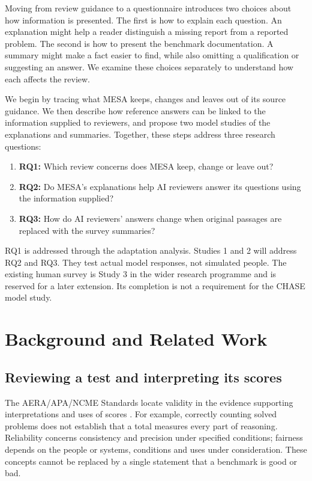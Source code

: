 \documentclass[10pt,conference]{IEEEtran}
\begin{document}
Moving from review guidance to a questionnaire introduces two choices about how information is presented. The first is how to explain each question. An explanation might help a reader distinguish a missing report from a reported problem. The second is how to present the benchmark documentation. A summary might make a fact easier to find, while also omitting a qualification or suggesting an answer. We examine these choices separately to understand how each affects the review.

We begin by tracing what MESA keeps, changes and leaves out of its source guidance. We then describe how reference answers can be linked to the information supplied to reviewers, and propose two model studies of the explanations and summaries. Together, these steps address three research questions:
\begin{enumerate}
\item \textbf{RQ1:} Which review concerns does MESA keep, change or leave out?
\item \textbf{RQ2:} Do MESA's explanations help AI reviewers answer its questions using the information supplied?
\item \textbf{RQ3:} How do AI reviewers' answers change when original passages are replaced with the survey summaries?
\end{enumerate}
RQ1 is addressed through the adaptation analysis. Studies 1 and 2 will address RQ2 and RQ3. They test actual model responses, not simulated people. The existing human survey is Study 3 in the wider research programme and is reserved for a later extension. Its completion is not a requirement for the CHASE model study.

\section{Background and Related Work}
\subsection{Reviewing a test and interpreting its scores}
The AERA/APA/NCME Standards locate validity in the evidence supporting interpretations and uses of scores \cite{aera_apa_ncme_standards_2014}. For example, correctly counting solved problems does not establish that a total measures every part of reasoning. Reliability concerns consistency and precision under specified conditions; fairness depends on the people or systems, conditions and uses under consideration. These concepts cannot be replaced by a single statement that a benchmark is good or bad.
\end{document}
